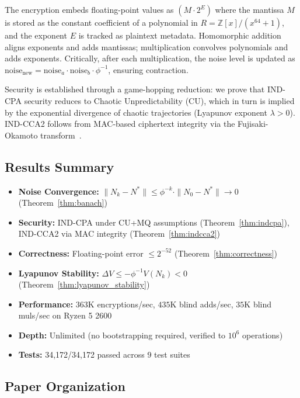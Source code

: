 \documentclass[11pt,a4paper]{article}
\begin{document}
The encryption embeds floating-point values as $(M \cdot 2^E)$ where the mantissa $M$ is stored as the constant coefficient of a polynomial in $R = \mathbb{Z}[x]/(x^{64}+1)$, and the exponent $E$ is tracked as plaintext metadata. Homomorphic addition aligns exponents and adds mantissas; multiplication convolves polynomials and adds exponents. Critically, after each multiplication, the noise level is updated as $\text{noise}_{\text{new}} = \text{noise}_a \cdot \text{noise}_b \cdot \phi^{-1}$, ensuring contraction.

Security is established through a game-hopping reduction: we prove that IND-CPA security reduces to Chaotic Unpredictability (CU), which in turn is implied by the exponential divergence of chaotic trajectories (Lyapunov exponent $\lambda > 0$). IND-CCA2 follows from MAC-based ciphertext integrity via the Fujisaki-Okamoto transform~\cite{fujisaki1999}.

\subsection{Results Summary}

\begin{itemize}[leftmargin=*,itemsep=2pt,topsep=2pt]
    \item \textbf{Noise Convergence:} $\|N_k - N^*\| \leq \phi^{-k} \cdot \|N_0 - N^*\| \to 0$ (Theorem~\ref{thm:banach})
    \item \textbf{Security:} IND-CPA under CU+MQ assumptions (Theorem~\ref{thm:indcpa}), IND-CCA2 via MAC integrity (Theorem~\ref{thm:indcca2})
    \item \textbf{Correctness:} Floating-point error $\leq 2^{-52}$ (Theorem~\ref{thm:correctness})
    \item \textbf{Lyapunov Stability:} $\Delta V \leq -\phi^{-1}V(N_k) < 0$ (Theorem~\ref{thm:lyapunov_stability})
    \item \textbf{Performance:} $363$K encryptions/sec, $435$K blind adds/sec, $35$K blind muls/sec on Ryzen 5 2600
    \item \textbf{Depth:} Unlimited (no bootstrapping required, verified to $10^6$ operations)
    \item \textbf{Tests:} 34,172/34,172 passed across 9 test suites
\end{itemize}

\subsection{Paper Organization}
\end{document}
